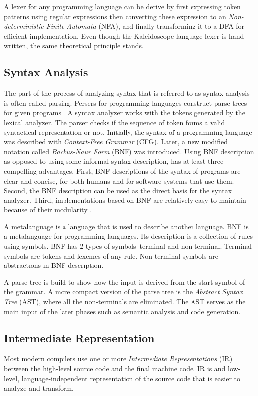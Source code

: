 \documentclass[acmlarge, nonacm]{acmart}
\begin{document}
A lexer for any programming language can be derive by first expressing token patterns using regular expressions then converting these expression to an \textit{Non-deterministic Finite Automata} (NFA), and finally transforming it to a DFA for efficient implementation. Even though the Kaleidoscope language lexer is hand-written, the same theoretical principle stands.

\subsection{Syntax Analysis}
The part of the process of analyzing syntax that is referred to as syntax analysis is often called parsing. Persers for programming languages construct parse trees for given programs \cite{sebesta}. A syntax analyzer works with the tokens generated by the lexical analyzer. The parser checks if the sequence of token forms a valid syntactical representation or not. Initially, the syntax of a programming language was described with \textit{Context-Free Grammar} (CFG). Later, a new modified notation called \textit{Backus-Naur Form} (BNF) was introduced. Using BNF description as opposed to using some informal syntax description, has at least three compelling advantages. First, BNF descriptions of the syntax of programs are clear and concise, for both humans and for software systems that use them. Second, the BNF description can be used as the direct basis for the syntax analyzer. Third, implementations based on BNF are relatively easy to maintain because of their modularity \cite{sebesta}.

A metalanguage is a language that is used to describe another language. BNF is a metalanguage for programming languages. Its description is a collection of rules using symbols. BNF has 2 types of symbols--terminal and non-terminal. Terminal symbols are tokens and lexemes of any rule. Non-terminal symbols are abstractions in BNF description.

A parse tree is build to show how the input is derived from the start symbol of the grammar. A more compact version of the parse tree is the \textit{Abstract Syntax Tree} (AST), where all the non-terminals are eliminated. The AST serves as the main input of the later phases such as semantic analysis and code generation.

\subsection{Intermediate Representation}
Most modern compilers use one or more \textit{Intermediate Representations} (IR) between the high-level source code and the final machine code. IR is and low-level, language-independent representation of the source code that is easier to analyze and transform.
\end{document}
